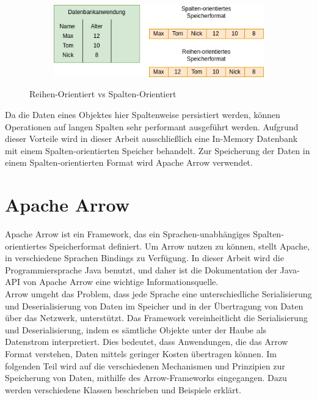\begin{figure}[h]
  \centering
  \begin{subfigure}[b]{0.5\textwidth}
    \includegraphics[width=1.0\linewidth]{img/speicher}
  \end{subfigure}
  \caption{Reihen-Orientiert vs Spalten-Orientiert}
  \label{graf_8}
\end{figure}

Da die Daten eines Objektes hier Spaltenweise persistiert werden, können Operationen auf langen Spalten sehr performant ausgeführt werden.
Aufgrund dieser Vorteile wird in dieser Arbeit ausschließlich eine In-Memory Datenbank mit einem Spalten-orientierten Speicher behandelt.
Zur Speicherung der Daten in einem Spalten-orientierten Format wird Apache Arrow verwendet.

\section{Apache Arrow}

Apache Arrow ist ein Framework, das ein Sprachen-unabhängiges Spalten-orientiertes Speicherformat definiert. 
Um Arrow nutzen zu können, stellt Apache, in verschiedene Sprachen Bindings zu Verfügung. In dieser Arbeit wird die Programmiersprache Java benutzt, und daher ist die Dokumentation der Java-API von Apache Arrow eine wichtige Informationsquelle.\cite{Apache:Arrow:JavaApi}\\
Arrow umgeht das Problem, dass jede Sprache eine unterschiedliche Serialisierung und Deserialisierung von Daten im Speicher und in der Übertragung von Daten über das Netzwerk, unterstützt.
Das Framework vereinheitlicht die Serialisierung und Deserialisierung, indem es sämtliche Objekte unter der Haube als Datenstrom interpretiert. Dies bedeutet, dass Anwendungen, die das Arrow Format verstehen, Daten mittels geringer Kosten übertragen können.\cite{Arrow:overview}
Im folgenden Teil wird auf die verschiedenen Mechanismen und Prinzipien zur Speicherung von Daten, mithilfe des Arrow-Frameworks eingegangen. Dazu werden verschiedene Klassen beschrieben und Beispiele erklärt.


